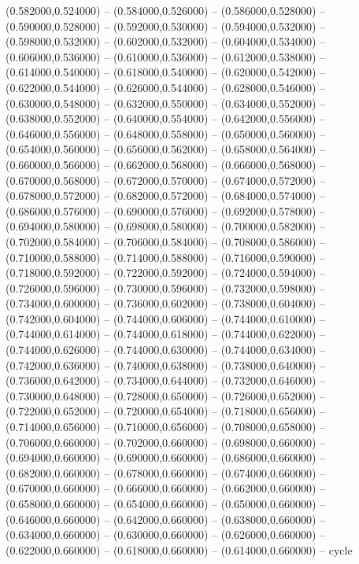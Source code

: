 (0.582000,0.524000) -- (0.584000,0.526000) -- (0.586000,0.528000) -- (0.590000,0.528000) -- (0.592000,0.530000) -- (0.594000,0.532000) -- (0.598000,0.532000) -- (0.602000,0.532000) -- (0.604000,0.534000) -- (0.606000,0.536000) -- (0.610000,0.536000) -- (0.612000,0.538000) -- (0.614000,0.540000) -- (0.618000,0.540000) -- (0.620000,0.542000) -- (0.622000,0.544000) -- (0.626000,0.544000) -- (0.628000,0.546000) -- (0.630000,0.548000) -- (0.632000,0.550000) -- (0.634000,0.552000) -- (0.638000,0.552000) -- (0.640000,0.554000) -- (0.642000,0.556000) -- (0.646000,0.556000) -- (0.648000,0.558000) -- (0.650000,0.560000) -- (0.654000,0.560000) -- (0.656000,0.562000) -- (0.658000,0.564000) -- (0.660000,0.566000) -- (0.662000,0.568000) -- (0.666000,0.568000) -- (0.670000,0.568000) -- (0.672000,0.570000) -- (0.674000,0.572000) -- (0.678000,0.572000) -- (0.682000,0.572000) -- (0.684000,0.574000) -- (0.686000,0.576000) -- (0.690000,0.576000) -- (0.692000,0.578000) -- (0.694000,0.580000) -- (0.698000,0.580000) -- (0.700000,0.582000) -- (0.702000,0.584000) -- (0.706000,0.584000) -- (0.708000,0.586000) -- (0.710000,0.588000) -- (0.714000,0.588000) -- (0.716000,0.590000) -- (0.718000,0.592000) -- (0.722000,0.592000) -- (0.724000,0.594000) -- (0.726000,0.596000) -- (0.730000,0.596000) -- (0.732000,0.598000) -- (0.734000,0.600000) -- (0.736000,0.602000) -- (0.738000,0.604000) -- (0.742000,0.604000) -- (0.744000,0.606000) -- (0.744000,0.610000) -- (0.744000,0.614000) -- (0.744000,0.618000) -- (0.744000,0.622000) -- (0.744000,0.626000) -- (0.744000,0.630000) -- (0.744000,0.634000) -- (0.742000,0.636000) -- (0.740000,0.638000) -- (0.738000,0.640000) -- (0.736000,0.642000) -- (0.734000,0.644000) -- (0.732000,0.646000) -- (0.730000,0.648000) -- (0.728000,0.650000) -- (0.726000,0.652000) -- (0.722000,0.652000) -- (0.720000,0.654000) -- (0.718000,0.656000) -- (0.714000,0.656000) -- (0.710000,0.656000) -- (0.708000,0.658000) -- (0.706000,0.660000) -- (0.702000,0.660000) -- (0.698000,0.660000) -- (0.694000,0.660000) -- (0.690000,0.660000) -- (0.686000,0.660000) -- (0.682000,0.660000) -- (0.678000,0.660000) -- (0.674000,0.660000) -- (0.670000,0.660000) -- (0.666000,0.660000) -- (0.662000,0.660000) -- (0.658000,0.660000) -- (0.654000,0.660000) -- (0.650000,0.660000) -- (0.646000,0.660000) -- (0.642000,0.660000) -- (0.638000,0.660000) -- (0.634000,0.660000) -- (0.630000,0.660000) -- (0.626000,0.660000) -- (0.622000,0.660000) -- (0.618000,0.660000) -- (0.614000,0.660000) -- cycle
